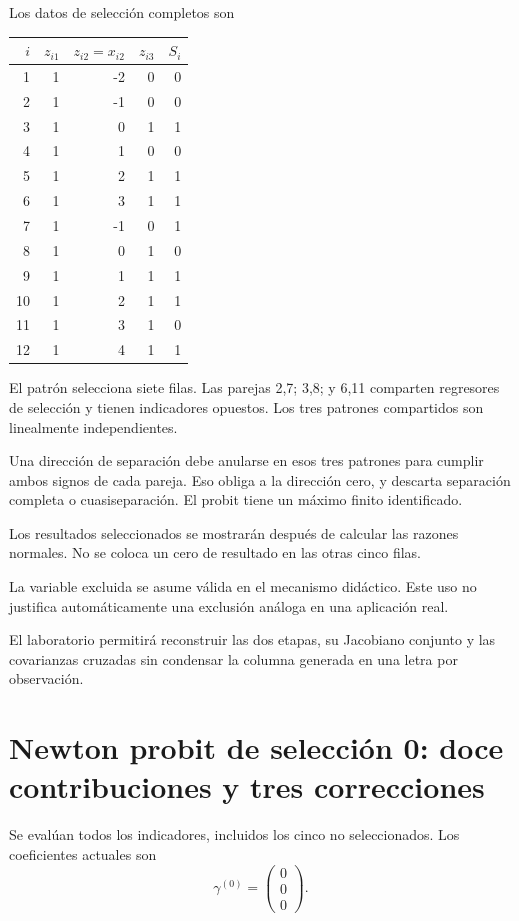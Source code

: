 \documentclass[11pt,a4paper]{article}
\begin{document}
Los datos de selección completos son
\begin{center}\small\begin{tabular}{rrrrr}\toprule
\(i\)&\(z_{i1}\)&\(z_{i2}=x_{i2}\)&\(z_{i3}\)&\(S_i\)\\\midrule
1&1&-2&0&0\\
2&1&-1&0&0\\
3&1&0&1&1\\
4&1&1&0&0\\
5&1&2&1&1\\
6&1&3&1&1\\
7&1&-1&0&1\\
8&1&0&1&0\\
9&1&1&1&1\\
10&1&2&1&1\\
11&1&3&1&0\\
12&1&4&1&1\\\bottomrule\end{tabular}\end{center}
El patrón selecciona siete filas.
Las parejas 2,7; 3,8; y 6,11
comparten regresores de selección
y tienen indicadores opuestos.
Los tres patrones compartidos
son linealmente independientes.

Una dirección de separación
debe anularse en esos
tres patrones para cumplir
ambos signos de cada pareja.
Eso obliga a la dirección
cero, y descarta separación
completa o cuasiseparación.
El probit tiene un
máximo finito identificado.

Los resultados seleccionados
se mostrarán después de
calcular las razones normales.
No se coloca un cero
de resultado en las otras
cinco filas.

La variable excluida se
asume válida en el
mecanismo didáctico.
Este uso no justifica
automáticamente una exclusión
análoga en una aplicación real.

El laboratorio permitirá reconstruir
las dos etapas, su
Jacobiano conjunto y
las covarianzas cruzadas
sin condensar la columna
generada en una letra
por observación.

\clearpage
\section{Newton probit de selección 0: doce contribuciones y tres correcciones}\label{unidad155}
Se evalúan todos los indicadores,
incluidos los cinco no seleccionados.
Los coeficientes actuales son
\[
\gamma^{(0)}=\begin{pmatrix}0\\0\\0\end{pmatrix}.
\]
\end{document}
